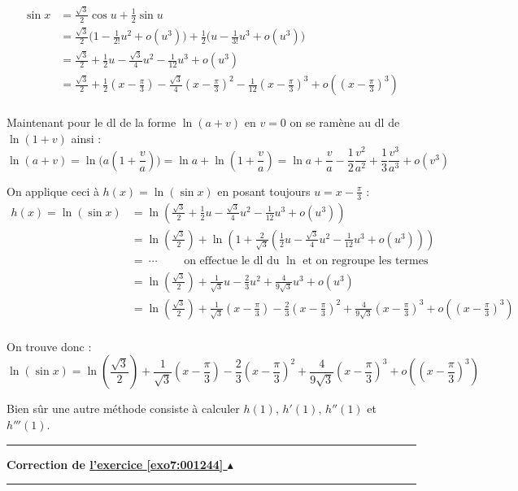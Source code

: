 \documentclass[11pt,a4paper]{article}
\newcounter{exo}
\newcommand{\correction}[1]{\hypertarget{cor7:#1}{}\label{cor7:#1}{\bf Correction de \hyperlink{exo7:#1}{l'exercice \ref{exo7:#1} $\blacktriangle$}}\vspace{1mm}\hrule\vspace{1mm}}
\newcommand{\fincorrection}{\vspace{1mm}\hrule\vspace*{7mm}}
\begin{document}
\begin{enumerate}
\begin{align*}
\sin x 
  & = \frac{\sqrt3}{2}\cos u +\frac12\sin u \\
  & = \frac{\sqrt3}{2} \bigg(1-\frac{1}{2!}u^2 + o(u^3) \bigg) + \frac{1}{2} \bigg( u -\frac{1}{3!}u^3 + o(u^3) \bigg) \\
  & = \frac{\sqrt3}{2} + \frac{1}{2} u -  \frac{\sqrt3}{4} u^2 -\frac{1}{12}u^3 + o(u^3) \\
  & = \frac{\sqrt3}{2} + \frac{1}{2} (x-\frac\pi3) -  \frac{\sqrt3}{4}(x-\frac\pi3)^2 -\frac{1}{12}(x-\frac\pi3)^3 + o((x-\frac\pi3)^3) \\
\end{align*}


\bigskip

Maintenant pour le dl de la forme $\ln(a+v)$ en $v=0$ on se ramène au dl de $\ln(1+v)$ ainsi :
$$\ln(a+v)=\ln\big(a(1 + \frac v a)\big) = \ln a + \ln(1 + \frac v a)
= \ln a + \frac v a - \frac12 \frac{v^2}{a^2}  + \frac13 \frac{v^3}{a^3} + o(v^3)$$

On applique ceci à $h(x)= \ln(\sin x)$ en posant toujours $u=x-\frac\pi3$ :
\begin{align*}
h(x)= \ln(\sin x)
  & = \ln\left(\frac{\sqrt3}{2} + \frac{1}{2} u -  \frac{\sqrt3}{4} u^2 -\frac{1}{12}u^3 + o(u^3)\right) \\
  & = \ln\left(\frac{\sqrt3}{2}\right) + \ln\left(1 + \frac{2}{\sqrt3}\left(\frac{1}{2} u -  \frac{\sqrt3}{4} u^2 -\frac{1}{12}u^3 + o(u^3)\right) \right) \\
  & = \ \cdots \qquad \text{ on effectue le dl du } \ln \text{ et on regroupe les termes} \\
  & = \ln\left(\frac{\sqrt3}{2}\right) + \frac{1}{\sqrt 3} u -\frac23 u^2 + \frac{4}{9\sqrt3}u^3 + o(u^3) \\
  & = \ln\left(\frac{\sqrt3}{2}\right) + \frac{1}{\sqrt 3}(x-\frac\pi3)  -\frac23 (x-\frac\pi3)^2 + \frac{4}{9\sqrt3}(x-\frac\pi3)^3 + o((x-\frac\pi3)^3) \\
\end{align*}

On trouve donc :
$$\ln(\sin x) = \ln\left(\frac{\sqrt3}{2}\right) + \frac{1}{\sqrt 3}(x-\frac\pi3) 
 -\frac23 (x-\frac\pi3)^2 + \frac{4}{9\sqrt3}(x-\frac\pi3)^3 + o((x-\frac\pi3)^3)$$


\bigskip Bien sûr une autre méthode consiste à calculer $h(1)$, $h'(1)$, $h''(1)$ et $h'''(1)$.

\end{enumerate}
\fincorrection
\correction{001244}
\end{document}

